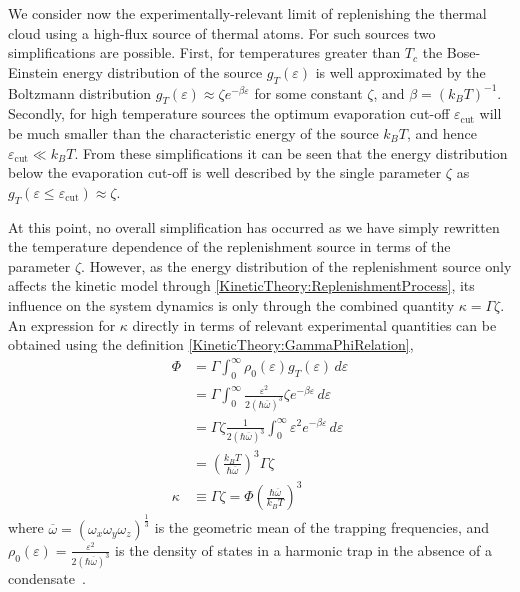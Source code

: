 We consider now the experimentally-relevant limit of replenishing the thermal cloud using a high-flux source of thermal atoms. For such sources two simplifications are possible. First, for temperatures greater than $T_c$ the Bose-Einstein energy distribution of the source $g_T(\varepsilon)$ is well approximated by the Boltzmann distribution $g_T(\varepsilon) \approx \zeta e^{-\beta \varepsilon}$ for some constant $\zeta$, and $\beta = \left(k_B T\right)^{-1}$. Secondly, for high temperature sources the optimum evaporation cut-off $\varepsilon_\text{cut}$ will be much smaller than the characteristic energy of the source $k_B T$, and hence $\varepsilon_\text{cut} \ll k_B T$.  From these simplifications it can be seen that the energy distribution below the evaporation cut-off is well described by the single parameter $\zeta$ as $g_T(\varepsilon \leq \varepsilon_\text{cut}) \approx \zeta$.

At this point, no overall simplification has occurred as we have simply rewritten the temperature dependence of the replenishment source in terms of the parameter $\zeta$.  However, as the energy distribution of the replenishment source only affects the kinetic model through \eqref{KineticTheory:ReplenishmentProcess}, its influence on the system dynamics is only through the combined quantity $\kappa = \Gamma \zeta$. An expression for $\kappa$ directly in terms of relevant experimental quantities can be obtained using the definition \eqref{KineticTheory:GammaPhiRelation},
\begin{align}
    \Phi &= \Gamma \int_0^\infty \rho_0(\varepsilon) g_T(\varepsilon)\, d\varepsilon\\
    &= \Gamma \int_0^\infty \frac{\varepsilon^2}{2 (\hbar \overline{\omega})^3} \zeta e^{-\beta \varepsilon}\, d\varepsilon\\
    &= \Gamma \zeta \frac{1}{2 (\hbar \overline{\omega})^3} \int_0^\infty \varepsilon^2 e^{-\beta \varepsilon}\, d\varepsilon\\
    &= \left(\frac{k_B T}{\hbar \overline{\omega}}\right)^3 \Gamma \zeta\\
    \kappa &\equiv \Gamma \zeta = \Phi \left(\frac{\hbar \overline{\omega}}{k_B T}\right)^3 \label{KineticTheory:KappaDefinition}
\end{align}
where $\overline{\omega} = \left(\omega_x \omega_y \omega_z\right)^{\frac{1}{3}}$ is the geometric mean of the trapping frequencies, and $\displaystyle\rho_0(\varepsilon) = \frac{\varepsilon^2}{2 (\hbar \overline{\omega})^3}$ is the density of states in a harmonic trap in the absence of a condensate~\citep{PethickSmith}.

